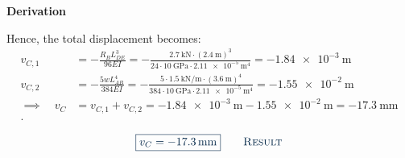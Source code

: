 \documentclass[a4paper]{article}
\numberwithin{equation}{problem}
\newcommand{\AUheading}[1]{%
  \par\vspace{.4\baselineskip}%
  {\sffamily\bfseries\color{AUblueDark}#1\par}%
  \nobreak%
}
\newenvironment{derivation}[1][Derivation]{%
  \AUheading{#1}
  \begingroup\allowdisplaybreaks
  \setlength{\abovedisplayskip}{6pt}%
  \setlength{\belowdisplayskip}{6pt}%
  \setlength{\abovedisplayshortskip}{4pt}%
  \setlength{\belowdisplayshortskip}{4pt}%
}{\par\endgroup\medskip}
\newcommand{\finalresult}[1]{%
  \vspace{.2\baselineskip}%
  \begin{equation}
    {\color{AUblueDark}\boxed{\displaystyle #1}}
    \tag*{\textsc{\textcolor{AUblueDark}{Result}}}
  \end{equation}
  \newpage
}
\begin{document}
\begin{derivation}
  Hence, the total displacement becomes:
  \begin{align*}
    v_{C,1} &= - \frac{R_B L_{DE}^3}{96 EI} = - \frac{\qty{2,7}{\kN} \cdot \left( \qty{2,4}{\m}  \right)^3}{24 \cdot \qty{10}{\GPa} \cdot \qty{2,11e-5}{\m^{4}} } = \qty{-1,84e-3}{\m} \\
    v_{C,2} &= - \frac{5 w L_{AB}^{4}}{384 EI} = - \frac{5 \cdot \qty{1,5}{\kN\per\m} \cdot \left( \qty{3,6}{\m}  \right)^{4}}{384 \cdot \qty{10}{\GPa} \cdot \qty{2,11e-5}{\m^{4}} } = \qty{-1,55e-2}{\m}  \\
    \implies \quad v_C &= v_{C,1} + v_{C,2} = \qty{-1,84e-3}{\m} - \qty{1,55e-2}{\m} = \qty{-17,3}{\mm}  \\
  .\end{align*}
\end{derivation}

\finalresult{
  v_C = \qty{-17,3}{\mm}
}
\end{document}
